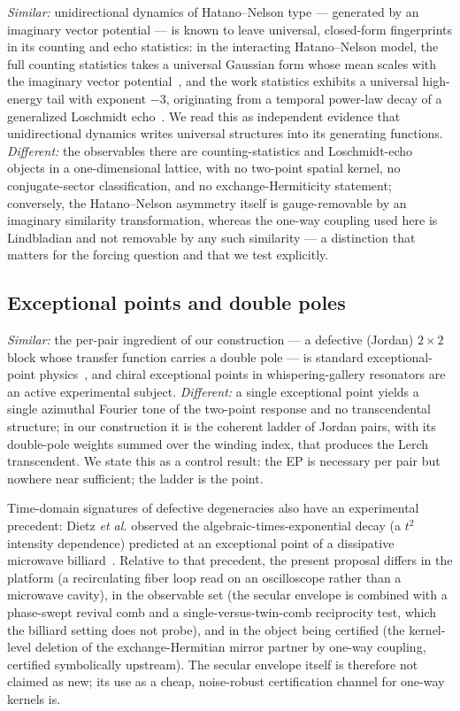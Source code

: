 \documentclass[11pt,a4paper]{article}
\begin{document}
\emph{Similar:} unidirectional dynamics of Hatano--Nelson type --- generated by
an imaginary vector potential --- is known to leave universal, closed-form
fingerprints in its counting and echo statistics: in the interacting
Hatano--Nelson model, the full counting statistics takes a universal Gaussian
form whose mean scales with the imaginary vector
potential~\cite{DoraMoca2022}, and the work statistics exhibits a universal
high-energy tail with exponent $-3$, originating from a temporal power-law
decay of a generalized Loschmidt echo~\cite{DoraMoca2023}. We read this as
independent evidence that unidirectional dynamics writes universal structures
into its generating functions. \emph{Different:} the observables there are
counting-statistics and Loschmidt-echo objects in a one-dimensional lattice,
with no two-point spatial kernel, no conjugate-sector classification, and no
exchange-Hermiticity statement; conversely, the Hatano--Nelson asymmetry
itself is gauge-removable by an imaginary similarity transformation, whereas
the one-way coupling used here is Lindbladian and not removable by any such
similarity --- a distinction that matters for the forcing question and that we
test explicitly.

\subsection{Exceptional points and double poles}

\emph{Similar:} the per-pair ingredient of our construction --- a defective
(Jordan) $2\times 2$ block whose transfer function carries a double pole --- is
standard exceptional-point physics~\cite{Heiss2012}, and chiral exceptional
points in whispering-gallery resonators are an active experimental subject.
\emph{Different:} a single exceptional point yields a single azimuthal Fourier
tone of the two-point response and no transcendental structure; in our
construction it is the coherent ladder of Jordan pairs, with its double-pole
weights summed over the winding index, that produces the Lerch transcendent. We
state this as a control result: the EP is necessary per pair but nowhere near
sufficient; the ladder is the point.

Time-domain signatures of defective degeneracies also have an experimental
precedent: Dietz \emph{et al.} observed the algebraic-times-exponential decay
(a $t^{2}$ intensity dependence) predicted at an exceptional point of a
dissipative microwave billiard~\cite{Dietz2007}. Relative to that precedent,
the present proposal differs in the platform (a recirculating fiber loop read
on an oscilloscope rather than a microwave cavity), in the observable set (the
secular envelope is combined with a phase-swept revival comb and a
single-versus-twin-comb reciprocity test, which the billiard setting does not
probe), and in the object being certified (the kernel-level deletion of the
exchange-Hermitian mirror partner by one-way coupling, certified symbolically
upstream). The secular envelope itself is therefore not claimed as new; its
use as a cheap, noise-robust certification channel for one-way kernels is.
\end{document}
